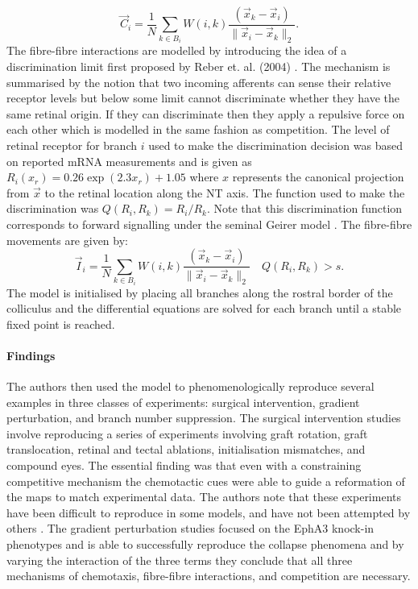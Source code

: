 \begin{equation}
\vec{C}_i = \frac{1}{N} \sum_{k \in B_i} W(i, k) \frac{(\vec{x}_k - \vec{x}_i)}{\lVert \vec{x}_i - \vec{x}_k \rVert_2}.
\end{equation}
The fibre-fibre interactions are modelled by introducing the idea of a discrimination limit first proposed by Reber et. al. (2004) \cite{Reber2004-wq}. The mechanism is summarised by the notion that two incoming afferents can sense their relative receptor levels but below some limit cannot discriminate whether they have the same retinal origin. If they can discriminate then they apply a repulsive force on each other which is modelled in the same fashion as competition. The level of retinal receptor for branch $i$ used to make the discrimination decision was based on reported mRNA measurements and is given as $R_i(x_{r}) = 0.26\exp(2.3x_{r}) + 1.05$ where $x$ represents the canonical projection from $\vec{x}$ to the retinal location along the NT axis. The function used to make the discrimination was $Q(R_i, R_k) = R_i / R_k$. Note that this discrimination function corresponds to forward signalling under the seminal Geirer model \cite{Gierer1983-tn}. The fibre-fibre movements are given by:
\begin{equation}
\vec{I}_i = \frac{1}{N} \sum_{k \in B_i} W(i, k) \frac{(\vec{x}_k - \vec{x}_i)}{\lVert \vec{x}_i - \vec{x}_k \rVert_2} \quad Q(R_i, R_k) > s.
\end{equation}
The model is initialised by placing all branches along the rostral border of the colliculus and the differential equations are solved for each branch until a stable fixed point is reached. 
\paragraph{Findings}
The authors then used the model to phenomenologically reproduce several examples in three classes of experiments: surgical intervention, gradient perturbation, and branch number suppression. The surgical intervention studies involve reproducing a series of experiments involving graft rotation, graft translocation, retinal and tectal ablations, initialisation mismatches, and compound eyes. The essential finding was that even with a constraining competitive mechanism the chemotactic cues were able to guide a reformation of the maps to match experimental data. The authors note that these experiments have been difficult to reproduce in some models, and have not been attempted by others \cite{Goodhill2005-ly, Purves2001-lr}. The gradient perturbation studies focused on the EphA3 knock-in phenotypes and is able to successfully reproduce the collapse phenomena and by varying the interaction of the three terms they conclude that all three mechanisms of chemotaxis, fibre-fibre interactions, and competition are necessary.  

